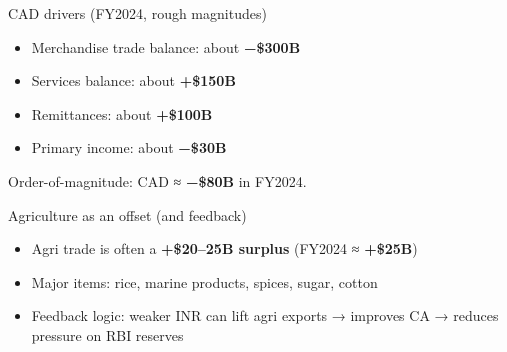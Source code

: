\documentclass[
  ignorenonframetext,
  aspectratio=169,
]{beamer}
\makeatletter
\providecommand{\tightlist}{%
  \setlength{\itemsep}{0pt}\setlength{\parskip}{0pt}}
\let\quarto@originallabel\label
\DeclareRobustCommand*{\label}[1]{\quarto@originallabel{#1}}
\makeatother
\begin{document}
\begin{frame}{CAD drivers (FY2024, rough magnitudes)}
\label{cad-drivers-fy2024-rough-magnitudes}
\begin{itemize}
\tightlist
\item
  Merchandise trade balance: about \textbf{−\$300B}
\item
  Services balance: about \textbf{+\$150B}
\item
  Remittances: about \textbf{+\$100B}
\item
  Primary income: about \textbf{−\$30B}
\end{itemize}

Order-of-magnitude: CAD ≈ \textbf{−\$80B} in FY2024.
\end{frame}

\begin{frame}{Agriculture as an offset (and feedback)}
\label{agriculture-as-an-offset-and-feedback}
\begin{itemize}
\tightlist
\item
  Agri trade is often a \textbf{+\$20--25B surplus} (FY2024 ≈
  \textbf{+\$25B})
\item
  Major items: rice, marine products, spices, sugar, cotton
\item
  Feedback logic: weaker INR can lift agri exports → improves CA →
  reduces pressure on RBI reserves
\end{itemize}
\end{frame}
\end{document}

